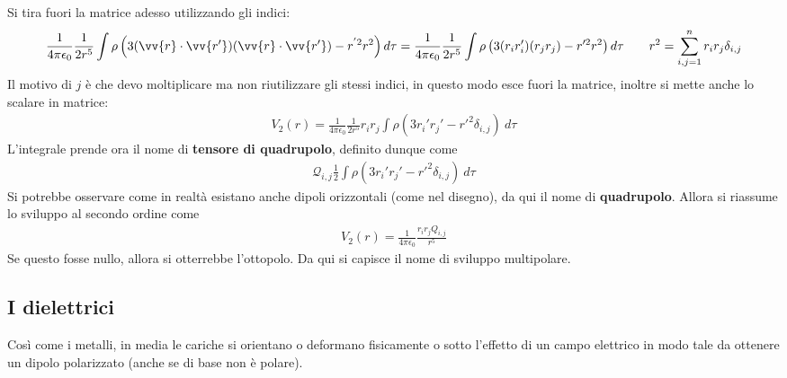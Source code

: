 \documentclass[a4paper, oneside]{article}
\begin{document}
Si tira fuori la matrice adesso utilizzando gli indici:
\begin{gather*}
    \frac{1}{4\pi\epsilon_0} \frac{1}{2r^{5}} \int \rho \left(3(\vv{r} \cdot \vv{r'}  ) (\vv{r}\cdot \vv{r'}  ) - r^{'2} r^{2}\right) d\tau =  \frac{1}{4\pi\epsilon_0} \frac{1}{2r^{5}} \int \rho \left(3(r_ir_i')(r_jr_j) - r'^{2} r^{2}\right) d\tau \qquad r^{2} = \sum_{i, j = 1}^{n} r_ir_j \delta_{i, j}
\end{gather*}
Il motivo di $j$ è che devo moltiplicare ma non riutilizzare gli stessi indici, in questo modo esce fuori la matrice, 
inoltre si mette anche lo scalare in matrice:
\begin{gather*}
    V_2(r) = \frac{1}{4\pi\epsilon_0} \frac{1}{2r^{5}} r_i r_j \int \rho\left(3r_i'r_j' - r'^{2}\delta_{i,j}\right)  \ d\tau
\end{gather*}
L'integrale prende ora il nome di \textbf{tensore di quadrupolo}, definito dunque come
\begin{gather*}
    \mathcal{Q}_{i, j }\frac{1}{2} \int \rho (3r_i'r_j' - r'^{2}\delta_{i, j}) \ d\tau 
\end{gather*}
Si potrebbe osservare come in realtà esistano anche dipoli orizzontali (come
nel disegno), da qui il nome di \textbf{quadrupolo}. Allora si riassume lo sviluppo al secondo ordine come 
\begin{gather*}
    V_2(r) = \frac{1}{4\pi\epsilon_0} \frac{r_ir_j Q_{i, j}}{r^{5}}
\end{gather*}
Se questo fosse nullo, allora si otterrebbe l'ottopolo. Da qui si capisce il nome di sviluppo
multipolare. 

\subsection{I dielettrici}
Così come i metalli, in media le cariche si orientano o deformano fisicamente o sotto l'effetto di un campo 
elettrico in modo tale da ottenere un dipolo polarizzato (anche se di base non è polare).
\end{document}
